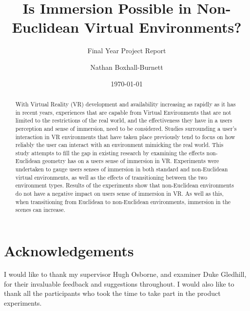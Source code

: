 \documentclass[abstract=on,12pt]{scrreprt}
\title{Is Immersion Possible in Non-Euclidean Virtual Environments?}
\subtitle{Final Year Project Report}
\author{Nathan Boxhall-Burnett}
\date{\mydate\today}
\begin{document}
	\maketitle


	\tableofcontents

	\begin{abstract}
		\thispagestyle{plain}

		With Virtual Reality (VR) development and availability increasing as rapidly as it has in recent years, experiences that are capable from Virtual Environments that are not limited to the restrictions of the real world, and the effectiveness they have in a users perception and sense of immersion, need to be considered.
		Studies surrounding a user's interaction in VR environments that have taken place previously tend to focus on how reliably the user can interact with an environment mimicking the real world.
		This study attempts to fill the gap in existing research by examining the effects non-Euclidean geometry has on a users sense of immersion in VR.
		Experiments were undertaken to gauge users senses of immersion in both standard and non-Euclidean virtual environments, as well as the effects of transitioning between the two environment types.
		Results of the experiments show that non-Euclidean environments do not have a negative impact on users sense of immersion in VR.
		As well as this, when transitioning from Euclidean to non-Euclidean environments, immersion in the scenes can increase.
	\end{abstract}

	\titleformat{\chapter}[hang]{\large\bfseries}{\thechapter}{1em}{\large}

	\setcounter{secnumdepth}{-2}

	\chapter{Acknowledgements}
		I would like to thank my supervisor Hugh Osborne, and examiner Duke Gledhill, for their invaluable feedback and suggestions throughout.
		I would also like to thank all the participants who took the time to take part in the product experiments.
\end{document}
